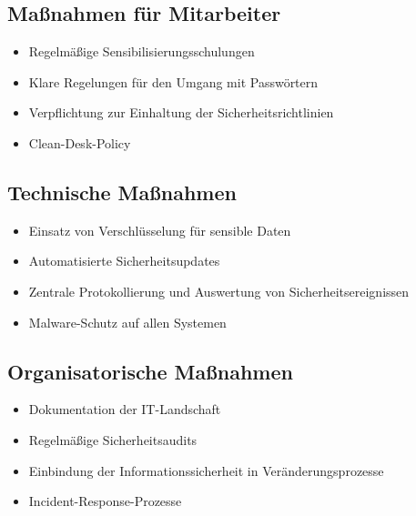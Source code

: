 \documentclass{orgstandard}
\begin{document}
\subsection{Maßnahmen für Mitarbeiter}
\label{sec:orgd928c2f}
\begin{itemize}
\item Regelmäßige Sensibilisierungsschulungen
\item Klare Regelungen für den Umgang mit Passwörtern
\item Verpflichtung zur Einhaltung der Sicherheitsrichtlinien
\item Clean-Desk-Policy
\end{itemize}
\subsection{Technische Maßnahmen}
\label{sec:org565b9b9}
\begin{itemize}
\item Einsatz von Verschlüsselung für sensible Daten
\item Automatisierte Sicherheitsupdates
\item Zentrale Protokollierung und Auswertung von Sicherheitsereignissen
\item Malware-Schutz auf allen Systemen
\end{itemize}
\subsection{Organisatorische Maßnahmen}
\label{sec:orge3a5b25}
\begin{itemize}
\item Dokumentation der IT-Landschaft
\item Regelmäßige Sicherheitsaudits
\item Einbindung der Informationssicherheit in Veränderungsprozesse
\item Incident-Response-Prozesse
\end{itemize}
\end{document}
